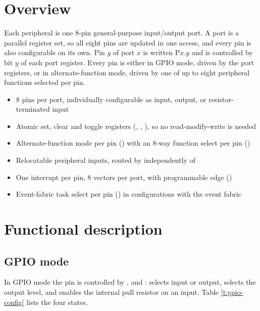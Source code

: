 \section{Overview}

Each  peripheral is one 8-pin general-purpose input/output port. A port is a parallel register set, so all eight pins are updated in one access, and every pin is also configurable on its own. Pin $y$ of port $x$ is written P$x$.$y$ and is controlled by bit $y$ of each port register. Every pin is either in GPIO mode, driven by the port registers, or in alternate-function mode, driven by one of up to eight peripheral functions selected per pin.

\begin{itemize}
	\item 8 pins per port, individually configurable as input, output, or resistor-terminated input
	\item Atomic set, clear and toggle registers (, , ), so no read-modify-write is needed
	\item Alternate-function mode per pin () with an 8-way function select per pin ()
	\item Relocatable peripheral inputs, routed by  independently of 
	\item One interrupt per pin, 8 vectors per port, with programmable edge ()
	\item Event-fabric task select per pin () in configurations with the event fabric
\end{itemize}

\section{Functional description}

\subsection{GPIO mode}

In GPIO mode the pin is controlled by ,  and :  selects input or output,  selects the output level, and  enables the internal pull resistor on an input. Table \ref{t:gpio-config} lists the four states.

